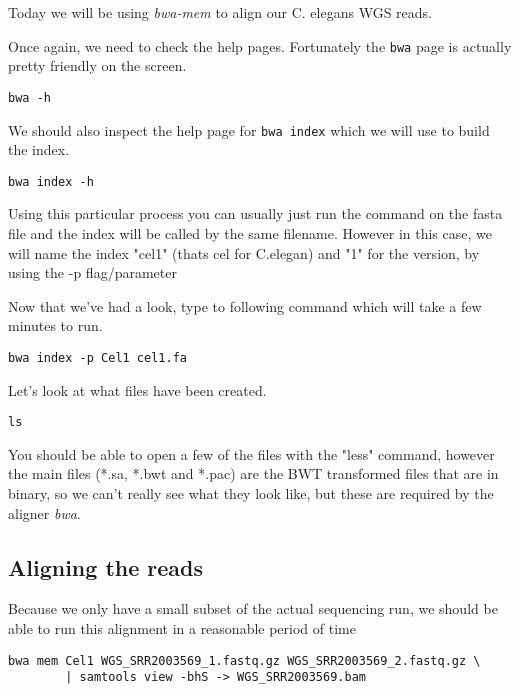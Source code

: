 Today we will be using \textit{bwa-mem} to align our C. elegans WGS reads.

\begin{steps}
Once again, we need to check the help pages.
Fortunately the \texttt{bwa} page is actually pretty friendly on the screen. \\
\begin{lstlisting}
bwa -h
\end{lstlisting}

We should also inspect the help page for \texttt{bwa index} which we will use to build the index.\\
\begin{lstlisting}
bwa index -h
\end{lstlisting}
Using this particular process you can usually just run the command on the fasta file and the index will be called by the same filename. However in this case, we will name the index "cel1" (thats cel for C.elegan) and "1" for the version, by using the -p flag/parameter
\end{steps}

\begin{steps}
Now that we've had a look, type to following command which will take a few minutes to run.
\begin{lstlisting}
bwa index -p Cel1 cel1.fa
\end{lstlisting}
\end{steps}

\begin{steps}
Let's look at what files have been created.
\begin{lstlisting}
ls
\end{lstlisting}
You should be able to open a few of the files with the "less" command, however the main files (*.sa, *.bwt and *.pac) are the BWT transformed files that are in binary, so we can't really see what they look like, but these are required by the aligner \textit{bwa}.
\end{steps}

\subsection{Aligning the reads}
Because we only have a small subset of the actual sequencing run, we should be able to run this alignment in a reasonable period of time
\begin{lstlisting}
bwa mem Cel1 WGS_SRR2003569_1.fastq.gz WGS_SRR2003569_2.fastq.gz \
        | samtools view -bhS -> WGS_SRR2003569.bam
\end{lstlisting}

